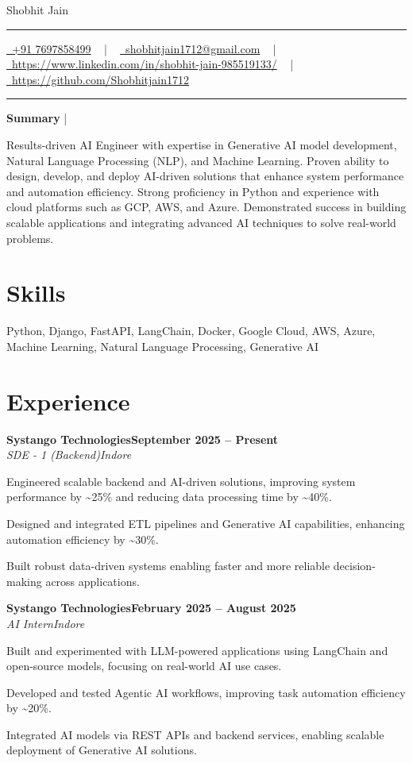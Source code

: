 \documentclass[letterpaper,10pt]{article}
\newcommand{\documentTitle}[2]{
  \begin{center}
    {\Huge\color{accentTitle} #1}
    \vspace{10pt}
    {\color{accentLine} \hrule}
    \vspace{2pt}
    \footnotesize{#2}
    \vspace{2pt}
    {\color{accentLine} \hrule}
  \end{center}
}
\newcommand{\tinysection}[1]{
  \phantomsection
  \addcontentsline{toc}{section}{#1}
  {\large{\bfseries\color{accentText}#1} {\color{accentLine} |}}
}
\newcommand{\heading}[2]{
  \hspace{10pt}#1\hfill#2\\
}
\newcommand{\headingBf}[2]{
  \heading{\textbf{#1}}{\textbf{#2}}
}
\newcommand{\headingIt}[2]{
  \heading{\textit{#1}}{\textit{#2}}
}
\newenvironment{resume_list}{
  \vspace{-7pt}
  \begin{itemize}[itemsep=-2px, parsep=1pt, leftmargin=30pt]
}{
  \end{itemize}
}
\begin{document}
\documentTitle{Shobhit Jain}{
  \href{tel:+91 7697858499}{\raisebox{-0.05\height} \faPhone\ +91 7697858499} ~ | ~
  \href{mailto:shobhitjain1712@gmail.com}{\raisebox{-0.15\height} \faEnvelope\ shobhitjain1712@gmail.com} ~ | ~
  \href{https://www.linkedin.com/in/shobhit-jain-985519133/}{\raisebox{-0.15\height} \faLinkedin\ https://www.linkedin.com/in/shobhit-jain-985519133/} ~ | ~
  \href{https://github.com/Shobhitjain1712}{\raisebox{-0.15\height} \faGithub\ https://github.com/Shobhitjain1712}
}

\tinysection{Summary}
Results-driven AI Engineer with expertise in Generative AI model development, Natural Language Processing (NLP), and Machine Learning. Proven ability to design, develop, and deploy AI-driven solutions that enhance system performance and automation efficiency. Strong proficiency in Python and experience with cloud platforms such as GCP, AWS, and Azure. Demonstrated success in building scalable applications and integrating advanced AI techniques to solve real-world problems.

\section{Skills}
\noindent Python, Django, FastAPI, LangChain, Docker, Google Cloud, AWS, Azure, Machine Learning, Natural Language Processing, Generative AI

\section{Experience}
\headingBf{Systango Technologies}{September 2025 -- Present}
\headingIt{SDE - 1 (Backend)}{Indore}
\begin{resume_list}
  \item Engineered scalable backend and AI-driven solutions, improving system performance by \textasciitilde{}25\% and reducing data processing time by \textasciitilde{}40\%.
  \item Designed and integrated ETL pipelines and Generative AI capabilities, enhancing automation efficiency by \textasciitilde{}30\%.
  \item Built robust data-driven systems enabling faster and more reliable decision-making across applications.
\end{resume_list}

\headingBf{Systango Technologies}{February 2025 -- August 2025}
\headingIt{AI Intern}{Indore}
\begin{resume_list}
  \item Built and experimented with LLM-powered applications using LangChain and open-source models, focusing on real-world AI use cases.
  \item Developed and tested Agentic AI workflows, improving task automation efficiency by \textasciitilde{}20\%.
  \item Integrated AI models via REST APIs and backend services, enabling scalable deployment of Generative AI solutions.
\end{resume_list}
\end{document}
